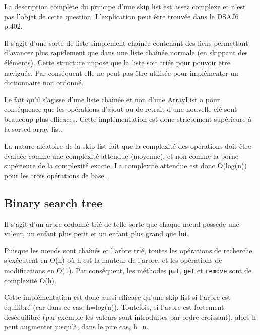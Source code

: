 \documentclass[10pt,a4paper]{article}
\begin{document}
	La description complète du principe d'une skip list est assez complexe et n'est pas l'objet de cette question. L'explication peut être trouvée dans le DSAJ6 p.402.
	
	Il s'agit d'une sorte de liste simplement chaînée contenant des liens permettant d'avancer plus rapidement que dans une liste chaînée normale (en skippant des éléments).
	Cette structure impose que la liste soit triée pour pouvoir être naviguée. Par conséquent elle ne peut pas être utilisée pour implémenter un dictionnaire non ordonné.
	
	Le fait qu'il s'agisse d'une liste chaînée et non d'une ArrayList a pour conséquence que les opérations d'ajout ou de retrait d'une nouvelle clé sont beaucoup plus efficaces. Cette implémentation est donc strictement supérieure à la sorted array list.
	
	La nature aléatoire de la skip list fait que la complexité des opérations doit être évaluée comme une complexité attendue (moyenne), et non comme la borne supérieure de la complexité exacte.
	La complexité attendue est donc O(log(n)) pour les trois opérations de base.
	
	\subsection*{Binary search tree}
	
	Il s'agit d'un arbre ordonné trié de telle sorte que chaque nœud possède une valeur, un enfant plus petit et un enfant plus grand que lui.
	
	Puisque les nœuds sont chaînés et l'arbre trié, toutes les opérations de recherche s'exécutent en O(h) où h est la hauteur de l'arbre, et les opérations de modifications en O(1). Par conséquent, les méthodes \texttt{put}, \texttt{get} et \texttt{remove} sont de complexité O(h).
	
	Cette implémentation est donc aussi efficace qu'une skip list si l'arbre est équilibré (car dans ce cas, h=log(n)). Toutefois, si l'arbre est fortement déséquilibré (par exemple les valeurs sont introduites par ordre croissant), alors h peut augmenter jusqu'à, dans le pire cas, h=n.
	
\end{document}
